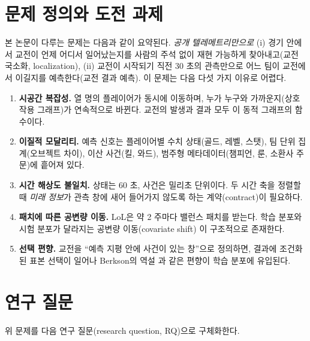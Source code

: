 \section{문제 정의와 도전 과제}
\label{sec:intro-challenges}

본 논문이 다루는 문제는 다음과 같이 요약된다. \emph{공개 텔레메트리만으로} (i) 경기 안에서 교전이 언제 어디서 일어났는지를 사람의 주석 없이 재현 가능하게 찾아내고(교전 국소화, localization), (ii) 교전이 시작되기 직전 30 초의 관측만으로 어느 팀이 교전에서 이길지를 예측한다(교전 결과 예측). 이 문제는 다음 다섯 가지 이유로 어렵다.

\begin{enumerate}[leftmargin=2em]
  \item \textbf{시공간 복잡성.} 열 명의 플레이어가 동시에 이동하며, 누가 누구와 가까운지(상호작용 그래프)가 연속적으로 바뀐다. 교전의 발생과 결과 모두 이 동적 그래프의 함수이다.
  \item \textbf{이질적 모달리티.} 예측 신호는 플레이어별 수치 상태(골드, 레벨, 스탯), 팀 단위 집계(오브젝트 차이), 이산 사건(킬, 와드), 범주형 메타데이터(챔피언, 룬, 소환사 주문)에 흩어져 있다.
  \item \textbf{시간 해상도 불일치.} 상태는 60 초, 사건은 밀리초 단위이다. 두 시간 축을 정렬할 때 \emph{미래 정보}가 관측 창에 새어 들어가지 않도록 하는 계약(contract)이 필요하다.
  \item \textbf{패치에 따른 공변량 이동.} LoL은 약 2 주마다 밸런스 패치를 받는다. 학습 분포와 시험 분포가 달라지는 공변량 이동(covariate shift) \cite{shimodaira2000improving,quinonero2009dataset}이 구조적으로 존재한다.
  \item \textbf{선택 편향.} 교전을 ``예측 지평 안에 사건이 있는 창''으로 정의하면, 결과에 조건화된 표본 선택이 일어나 Berkson의 역설 \cite{berkson1946limitations}과 같은 편향이 학습 분포에 유입된다.
\end{enumerate}

\section{연구 질문}
\label{sec:intro-rq}

위 문제를 다음 연구 질문(research question, RQ)으로 구체화한다.

